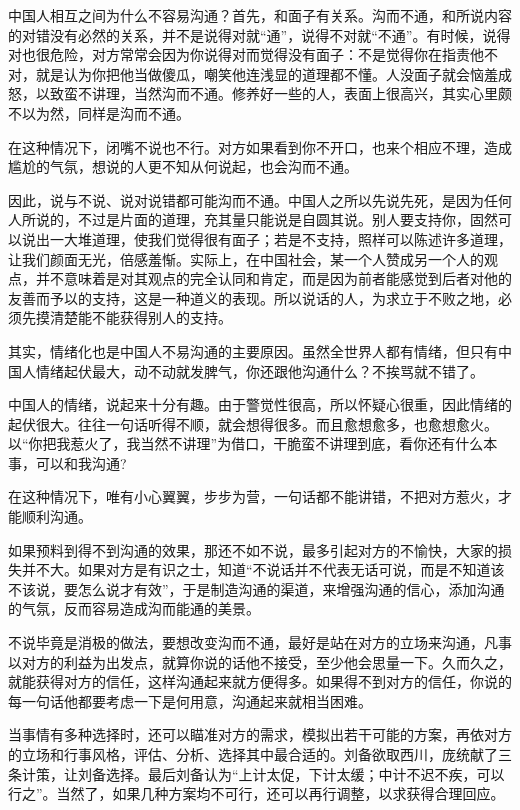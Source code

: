 \documentclass[fontset=fandol, a4paper, 12pt, openright]{ctexbook}
\begin{document}
中国人相互之间为什么不容易沟通？首先，和面子有关系。沟而不通，和所说内容的对错没有必然的关系，并不是说得对就“通”，说得不对就“不通”。有时候，说得对也很危险，对方常常会因为你说得对而觉得没有面子：不是觉得你在指责他不对，就是认为你把他当做傻瓜，嘲笑他连浅显的道理都不懂。人没面子就会恼羞成怒，以致蛮不讲理，当然沟而不通。修养好一些的人，表面上很高兴，其实心里颇不以为然，同样是沟而不通。

在这种情况下，闭嘴不说也不行。对方如果看到你不开口，也来个相应不理，造成尴尬的气氛，想说的人更不知从何说起，也会沟而不通。

因此，说与不说、说对说错都可能沟而不通。中国人之所以先说先死，是因为任何人所说的，不过是片面的道理，充其量只能说是自圆其说。别人要支持你，固然可以说出一大堆道理，使我们觉得很有面子；若是不支持，照样可以陈述许多道理，让我们颜面无光，倍感羞惭。实际上，在中国社会，某一个人赞成另一个人的观点，并不意味着是对其观点的完全认同和肯定，而是因为前者能感觉到后者对他的友善而予以的支持，这是一种道义的表现。所以说话的人，为求立于不败之地，必须先摸清楚能不能获得别人的支持。

其实，情绪化也是中国人不易沟通的主要原因。虽然全世界人都有情绪，但只有中国人情绪起伏最大，动不动就发脾气，你还跟他沟通什么？不挨骂就不错了。

中国人的情绪，说起来十分有趣。由于警觉性很高，所以怀疑心很重，因此情绪的起伏很大。往往一句话听得不顺，就会想得很多。而且愈想愈多，也愈想愈火。以“你把我惹火了，我当然不讲理”为借口，干脆蛮不讲理到底，看你还有什么本事，可以和我沟通?

在这种情况下，唯有小心翼翼，步步为营，一句话都不能讲错，不把对方惹火，才能顺利沟通。

如果预料到得不到沟通的效果，那还不如不说，最多引起对方的不愉快，大家的损失并不大。如果对方是有识之士，知道“不说话并不代表无话可说，而是不知道该不该说，要怎么说才有效”，于是制造沟通的渠道，来增强沟通的信心，添加沟通的气氛，反而容易造成沟而能通的美景。

不说毕竟是消极的做法，要想改变沟而不通，最好是站在对方的立场来沟通，凡事以对方的利益为出发点，就算你说的话他不接受，至少他会思量一下。久而久之，就能获得对方的信任，这样沟通起来就方便得多。如果得不到对方的信任，你说的每一句话他都要考虑一下是何用意，沟通起来就相当困难。

当事情有多种选择时，还可以瞄准对方的需求，模拟出若干可能的方案，再依对方的立场和行事风格，评估、分析、选择其中最合适的。刘备欲取西川，庞统献了三条计策，让刘备选择。最后刘备认为“上计太促，下计太缓；中计不迟不疾，可以行之”。当然了，如果几种方案均不可行，还可以再行调整，以求获得合理回应。
\end{document}
